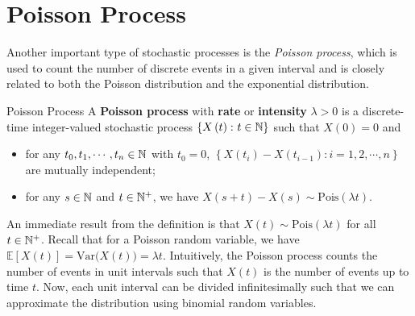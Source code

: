 \documentclass[math, code]{amznotes}
\theoremstyle{remark}
\begin{document}
\section{Poisson Process}
Another important type of stochastic processes is the \textit{Poisson process}, which is used to count the number of discrete events in a given interval and is closely related to both the Poisson distribution and the exponential distribution.
\begin{dfnbox}{Poisson Process}
    A {\color{red} \textbf{Poisson process}} with {\color{red} \textbf{rate}} or {\color{red} \textbf{intensity}} $\lambda > 0$ is a discrete-time integer-valued stochastic process $\left\{X\left(t\right) \colon t \in \mathbb{N}\right\}$ such that $X\left(0\right) = 0$ and
    \begin{itemize}
        \item for any $t_0, t_1, \cdots, t_n \in \mathbb{N}$ with $t_0 = 0$, $\left\{X\left(t_i\right) - X\left(t_{i - 1}\right) \colon i = 1, 2, \cdots, n\right\}$ are mutually independent;
        \item for any $s \in \mathbb{N}$ and $t \in \mathbb{N}^+$, we have $X\left(s + t\right) - X\left(s\right) \sim \mathrm{Pois}\left(\lambda t\right)$.
    \end{itemize}
\end{dfnbox}
An immediate result from the definition is that $X\left(t\right) \sim \mathrm{Pois}\left(\lambda t\right)$ for all $t \in \mathbb{N}^+$. Recall that for a Poisson random variable, we have $\mathbb{E}\left[X\left(t\right)\right] = \mathrm{Var}\bigl(X\left(t\right)\bigr) = \lambda t$. Intuitively, the Poisson process counts the number of events in unit intervals such that $X\left(t\right)$ is the number of events up to time $t$. Now, each unit interval can be divided infinitesimally such that we can approximate the distribution using binomial random variables.
\end{document}
